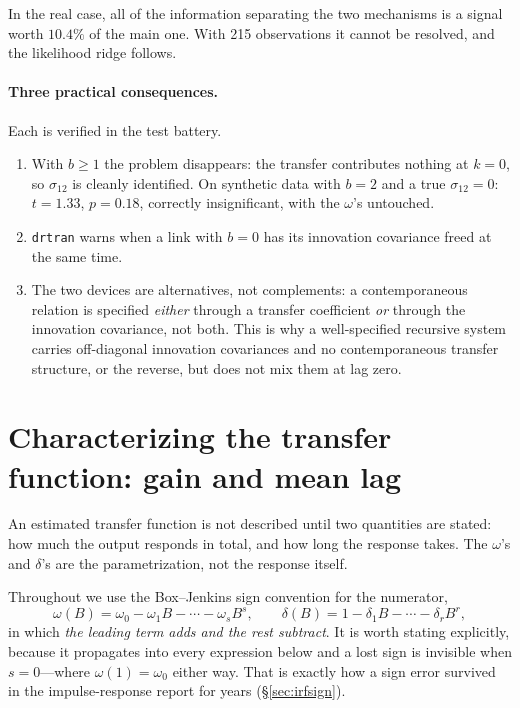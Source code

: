 \documentclass[11pt,a4paper]{article}
\theoremstyle{plain}
\theoremstyle{remark}
\begin{document}
In the real case, all of the information separating the two mechanisms is a signal
worth $10.4\%$ of the main one. With 215 observations it cannot be resolved, and the
likelihood ridge follows.

\paragraph{Three practical consequences.} Each is verified in the test battery.
\begin{enumerate}
\item With $b \ge 1$ the problem disappears: the transfer contributes nothing at
  $k=0$, so $\sigma_{12}$ is cleanly identified. On synthetic data with $b=2$ and
  a true $\sigma_{12}=0$: $t=1.33$, $p=0.18$, correctly insignificant, with the
  $\omega$'s untouched.
\item \texttt{drtran} warns when a link with $b=0$ has its innovation covariance
  freed at the same time.
\item The two devices are alternatives, not complements: a contemporaneous relation
  is specified \emph{either} through a transfer coefficient \emph{or} through the
  innovation covariance, not both. This is why a well-specified recursive system
  carries off-diagonal innovation covariances and no contemporaneous transfer
  structure, or the reverse, but does not mix them at lag zero.
\end{enumerate}


\section{Characterizing the transfer function: gain and mean lag}
\label{sec:gain}

An estimated transfer function is not described until two quantities are stated:
how much the output responds in total, and how long the response takes. The
$\omega$'s and $\delta$'s are the parametrization, not the response itself.

Throughout we use the Box--Jenkins sign convention for the numerator,
\begin{equation}
 \omega(B) = \omega_0 - \omega_1 B - \cdots - \omega_s B^{s},
 \qquad
 \delta(B) = 1 - \delta_1 B - \cdots - \delta_r B^{r},
 \label{eq:bjr}
\end{equation}
in which \emph{the leading term adds and the rest subtract}. It is worth stating
explicitly, because it propagates into every expression below and a lost sign is
invisible when $s=0$---where $\omega(1)=\omega_0$ either way. That is exactly how
a sign error survived in the impulse-response report for years
(\S\ref{sec:irfsign}).
\end{document}
